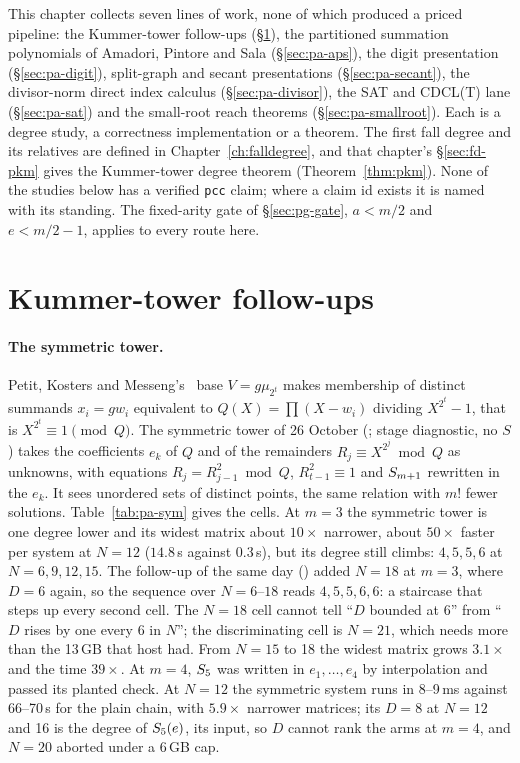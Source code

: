 This chapter collects seven lines of work, none of which produced a priced
pipeline: the Kummer-tower follow-ups (\S\ref{sec:pa-pkm}), the partitioned
summation polynomials of Amadori, Pintore and Sala (\S\ref{sec:pa-aps}), the
digit presentation (\S\ref{sec:pa-digit}), split-graph and secant
presentations (\S\ref{sec:pa-secant}), the divisor-norm direct index calculus
(\S\ref{sec:pa-divisor}), the SAT and CDCL(T) lane (\S\ref{sec:pa-sat}) and
the small-root reach theorems (\S\ref{sec:pa-smallroot}). Each is a degree
study, a correctness implementation or a theorem. The first fall degree and
its relatives are defined in Chapter~\ref{ch:falldegree}, and that
chapter's \S\ref{sec:fd-pkm} gives the Kummer-tower degree theorem
(Theorem~\ref{thm:pkm}). None of the studies below has a verified
\texttt{pcc} claim; where a claim id exists it is named with its standing.
The fixed-arity gate of \S\ref{sec:pg-gate}, $a<m/2$ and $e<m/2-1$, applies
to every route here.

\section{Kummer-tower follow-ups}\label{sec:pa-pkm}

\paragraph{The symmetric tower.} Petit, Kosters and
Messeng's~\cite{pkm2016} base $V=g\mu_{2^t}$ makes membership of distinct
summands $x_i=gw_i$ equivalent to $Q(X)=\prod(X-w_i)$ dividing
$X^{2^t}-1$, that is $X^{2^t}\equiv1\pmod Q$. The symmetric tower of 26
October (; stage diagnostic,
no $S$) takes the coefficients $e_k$ of $Q$ and of the remainders
$R_j\equiv X^{2^j}\bmod Q$ as unknowns, with equations $R_j=R_{j-1}^2\bmod Q$,
$R_{t-1}^2\equiv1$ and $S_{m+1}$ rewritten in the $e_k$. It sees unordered
sets of distinct points, the same relation with $m!$ fewer solutions.
Table~\ref{tab:pa-sym} gives the cells. At $m=3$ the symmetric tower is one
degree lower and its widest matrix about $10\times$ narrower, about
$50\times$ faster per system at $N=12$ ($14.8$\,s against $0.3$\,s), but its
degree still climbs: $4,5,5,6$ at $N=6,9,12,15$. The follow-up of the same
day () added $N=18$ at $m=3$,
where $D=6$ again, so the sequence over $N=6$--$18$ reads $4,5,5,6,6$: a
staircase that steps up every second cell. The $N=18$ cell cannot tell
``$D$ bounded at 6'' from ``$D$ rises by one every 6 in $N$''; the
discriminating cell is $N=21$, which needs more than the 13\,GB that host
had. From $N=15$ to 18 the widest matrix grows $3.1\times$ and the time
$39\times$. At $m=4$, $S_{5}$ was written in $e_1,\dots,e_4$ by
interpolation and passed its planted check. At $N=12$ the symmetric system
runs in 8--9\,ms against 66--70\,s for the plain chain, with
$5.9\times$ narrower matrices; its $D=8$ at $N=12$ and 16 is the degree of
$S_{5}(e)$, its input, so $D$ cannot rank the arms at $m=4$, and $N=20$
aborted under a 6\,GB cap.

